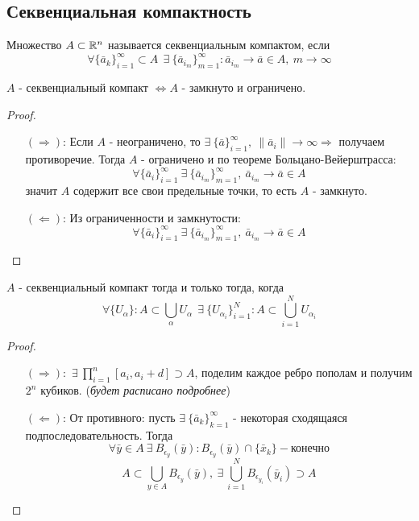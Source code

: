 \subsection{Секвенциальная компактность}
\begin{definition}
    Множество $A\subset \mathbb{R}^n$ называется секвенциальным компактом, если 
    \[\forall \{\bar{a}_k\}_{i=1}^{\infty}\subset A\ \ \exists\ \{\bar{a}_{i_m}\}_{m=1}^{\infty}: \bar{a}_{i_m}\to \bar{a} \in A,\ m\to \infty\]
\end{definition}  
\begin{theorem}
    $A$ - секвенциальный компакт $\Leftrightarrow A$ - замкнуто и ограничено. 
\end{theorem}
\begin{proof}\tab
    \begin{itemize}
        \item[$(\Rightarrow)$:] Если $A$ - неограничено, то $\exists\ \{\bar{a}\}_{i=1}^{\infty},\ \|\bar{a}_i\|\to \infty \Rightarrow$ получаем противоречие.
        Тогда $A$ - ограничено и по теореме Больцано-Вейерштрасса:
        \[\forall \{\bar{a}_i\}_{i=1}^{\infty}\ \exists\ \{\bar{a}_{i_m}\}_{m=1}^{\infty},\ \bar{a}_{i_m} \to \bar{a}\in A\]
        значит $A$ содержит все свои предельные точки, то есть $A$ - замкнуто.
        \item[$(\Leftarrow)$:] Из ограниченности и замкнутости:
        \[\forall \{\bar{a}_i\}_{i=1}^{\infty}\ \exists\ \{\bar{a}_{i_m}\}_{m=1}^{\infty},\ \bar{a}_{i_m} \to \bar{a}\in A\]
    \end{itemize}
\end{proof} 
\begin{theorem}
    $A$ - секвенциальный компакт тогда и только тогда, когда
    \[\forall \{U_{\alpha}\}: A\subset \bigcup_{\alpha}U_{\alpha}\ \ \exists\ \{U_{\alpha_i}\}_{i=1}^N: A\subset \bigcup_{i=1}^N U_{\alpha_i}\]
\end{theorem} 
\begin{proof}\tab
    \begin{itemize}
        \item[$(\Rightarrow):$] $\exists\ \prod\limits_{i=1}^{n}[a_i, a_i+d]\supset A$, поделим каждое ребро пополам и получим $2^n$ кубиков.
        (\textit{будет расписано подробнее})
        \item[$(\Leftarrow)$:] От противного: пусть $\exists\ \{\bar{a}_k\}_{k=1}^{\infty}$ - некоторая сходящаяся подпоследовательность. Тогда 
        \[\forall \bar{y}\in A\ \exists\ B_{\epsilon_y}(\bar{y}): B_{\epsilon_y}(\bar{y})\cap \{\bar{x}_k\} - \text{конечно}\]
        \[A\subset \bigcup_{y\in A}B_{\epsilon_y}(\bar{y}),\ \exists\ \bigcup_{i=1}^N B_{\epsilon_{y_i}}(\bar{y}_i)\supset A\]
    \end{itemize}
\end{proof} 
